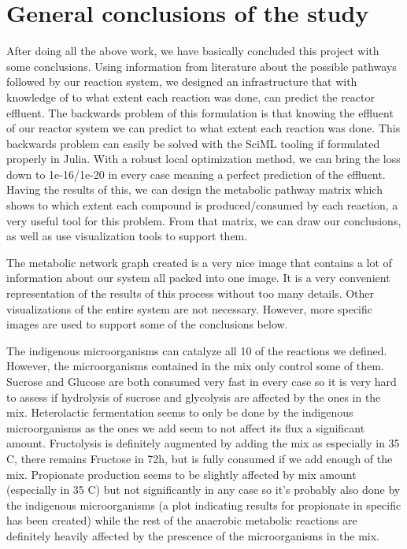 \documentclass[11pt]{article}
\begin{document}
\section{General conclusions of the study}
\label{sec:orgf3c42cf}
After doing all the above work, we have basically concluded this project with some conclusions. Using information from literature about the possible pathways followed by our reaction system, we designed an infrastructure that with knowledge of to what extent each reaction was done, can predict the reactor effluent. The backwards problem of this formulation is that knowing the effluent of our reactor system we can predict to what extent each reaction was done. This backwards problem can easily be solved with the SciML tooling if formulated properly in Julia. With a robust local optimization method, we can bring the loss down to 1e-16/1e-20 in every case meaning a perfect prediction of the effluent. Having the results of this, we can design the metabolic pathway matrix which shows to which extent each compound is produced/consumed by each reaction, a very useful tool for this problem. From that matrix, we can draw our conclusions, as well as use visualization tools to support them.

The metabolic network graph created is a very nice image that contains a lot of information about our system all packed into one image. It is a very convenient representation of the results of this process without too many details. Other visualizations of the entire system are not necessary. However, more specific images are used to support some of the conclusions below.

The indigenous microorganisms can catalyze all 10 of the reactions we defined. However, the microorganisms contained in the mix only control some of them. Sucrose and Glucose are both consumed very fast in every case so it is very hard to assess if hydrolysis of sucrose and glycolysis are affected by the ones in the mix.
Heterolactic fermentation seems to only be done by the indigenous microorganisms as the ones we add seem to not affect its flux a significant amount. Fructolysis is definitely augmented by adding the mix as especially in 35 C, there remains Fructose in 72h, but is fully consumed if we add enough of the mix. Propionate production seems to be slightly affected by mix amount (especially in 35 C) but not significantly in any case so it's probably also done by the indigenous microorganisms (a plot indicating results for propionate in specific has been created) while the rest of the anaerobic metabolic reactions are definitely heavily affected by the prescence of the microorganisms in the mix.
\end{document}
